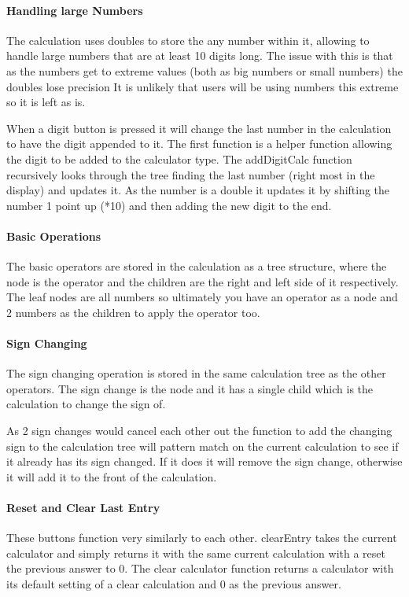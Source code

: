 \documentclass[a4paper]{article}
\begin{document}
\paragraph{Handling large Numbers}
The calculation uses doubles to store the any number within it, allowing to handle large numbers that are at least 10 digits long.
The issue with this is that as the numbers get to extreme values (both as big numbers or small numbers) the doubles lose precision
It is unlikely that users will be using numbers this extreme so it is left as is.
\par
When a digit button is pressed it will change the last number in the calculation to have the digit appended to it.
The first function is a helper function allowing the digit to be added to the calculator type.
The addDigitCalc function recursively looks through the tree finding the last number (right most in the display) and updates it.
As the number is a double it updates it by shifting the number 1 point up (*10) and then adding the new digit to the end.


\paragraph{Basic Operations}
The basic operators are stored in the calculation as a tree structure, where the node is the operator and the children are the right and left side of it respectively.
The leaf nodes are all numbers so ultimately you have an operator as a node and 2 numbers as the children to apply the operator too.

\paragraph{Sign Changing}
The sign changing operation is stored in the same calculation tree as the other operators.
The sign change is the node and it has a single child which is the calculation to change the sign of.
\par
As 2 sign changes would cancel each other out the function to add the changing sign to the calculation tree will pattern match on the current calculation to see if it already has its sign changed.
If it does it will remove the sign change, otherwise it will add it to the front of the calculation.


\paragraph{Reset and Clear Last Entry}
These buttons function very similarly to each other.
clearEntry takes the current calculator and simply returns it with the same current calculation with a reset the previous answer to 0.
The clear calculator function returns a calculator with its default setting of a clear calculation and 0 as the previous answer.

\end{document}
